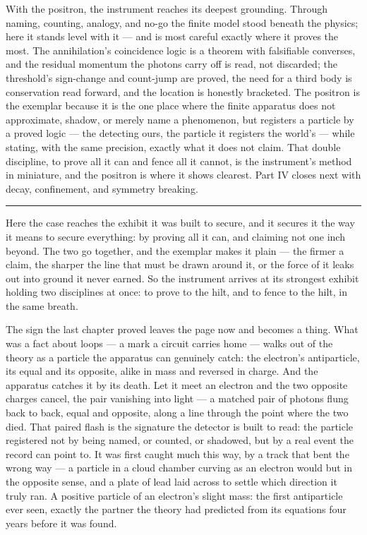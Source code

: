 \bigskip

With the positron, the instrument reaches its deepest grounding. Through naming, counting, analogy, and no-go the
finite model stood beneath the physics; here it stands level with it --- and is most careful exactly where it
proves the most. The annihilation's coincidence logic is a theorem with falsifiable converses, and the residual
momentum the photons carry off is read, not discarded; the threshold's sign-change and count-jump are proved,
the need for a third body is conservation read forward, and the location is honestly bracketed. The positron is
the exemplar because it is the one place where the finite apparatus does not approximate, shadow, or merely
name a phenomenon, but registers a particle by a proved logic --- the detecting ours, the particle it
registers the world's --- while stating, with the same precision, exactly what it does not claim. That double discipline, to prove all it can and fence all it cannot, is the
instrument's method in miniature, and the positron is where it shows clearest. Part IV closes next with decay,
confinement, and symmetry breaking.

\bigskip
\begin{center}
\rule{0.4\textwidth}{0.4pt}
\end{center}
\bigskip

\noindent Here the case reaches the exhibit it was built to secure, and it secures it the way it means to secure
everything: by proving all it can, and claiming not one inch beyond. The two go together, and the exemplar makes
it plain --- the firmer a claim, the sharper the line that must be drawn around it, or the force of it leaks out
into ground it never earned. So the instrument arrives at its strongest exhibit holding two disciplines at once:
to prove to the hilt, and to fence to the hilt, in the same breath.

The sign the last chapter proved leaves the page now and becomes a thing. What was a fact about loops --- a mark
a circuit carries home --- walks out of the theory as a particle the apparatus can genuinely catch: the
electron's antiparticle, its equal and its opposite, alike in mass and reversed in charge. And the apparatus
catches it by its death. Let it meet an electron and the two opposite charges cancel, the pair vanishing into
light --- a matched pair of photons flung back to back, equal and opposite, along a line through the point where
the two died. That paired flash is the signature the detector is built to read: the particle registered not by
being named, or counted, or shadowed, but by a real event the record can point to. It was first caught much this
way, by a track that bent the wrong way --- a particle in a cloud chamber curving as an electron would but in
the opposite sense, and a plate of lead laid across to settle which direction it truly ran. A positive particle
of an electron's slight mass: the first antiparticle ever seen, exactly the partner the theory had predicted
from its equations four years before it was found.

